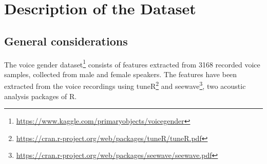 
\chapter{Description of the Dataset}
\label{chap:dataset}

\section{General considerations}
\label{sec:gen_cons}
The voice gender dataset\footnote{\url{https://www.kaggle.com/primaryobjects/voicegender}} consists of features extracted from \num{3168} recorded voice samples, collected from male and female speakers. 
The features have been extracted from the voice recordings using tuneR\footnote{\url{https://cran.r-project.org/web/packages/tuneR/tuneR.pdf}} and seewave\footnote{\url{https://cran.r-project.org/web/packages/seewave/seewave.pdf}}, two acoustic analysis packages of R.

